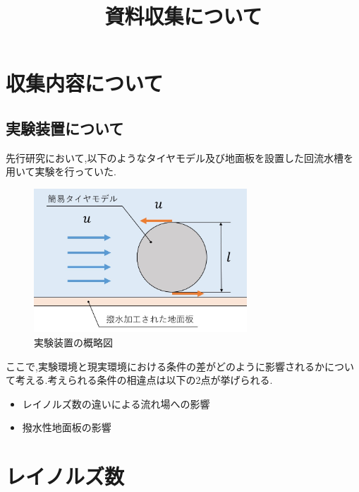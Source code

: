 \documentclass[twocolumn,a4j]{jsarticle}
\author{}
\title{資料収集について}
\date{}
\begin{document}
\maketitle
\section{\large 収集内容について}
\subsection{実験装置について}
先行研究において,以下のようなタイヤモデル及び地面板を設置した回流水槽を用いて実験を行っていた.\par
\begin{figure}[htbp]
    \begin{center}
        \includegraphics[width=80mm]{image_1.jpg}
        \caption{実験装置の概略図}
    \end{center}
\end{figure}
ここで,実験環境と現実環境における条件の差がどのように影響されるかについて考える.考えられる条件の相違点は以下の2点が挙げられる.
\begin{itemize}
    \item レイノルズ数の違いによる流れ場への影響
    \item 撥水性地面板の影響
\end{itemize}
\section{\large レイノルズ数}
\end{document}

